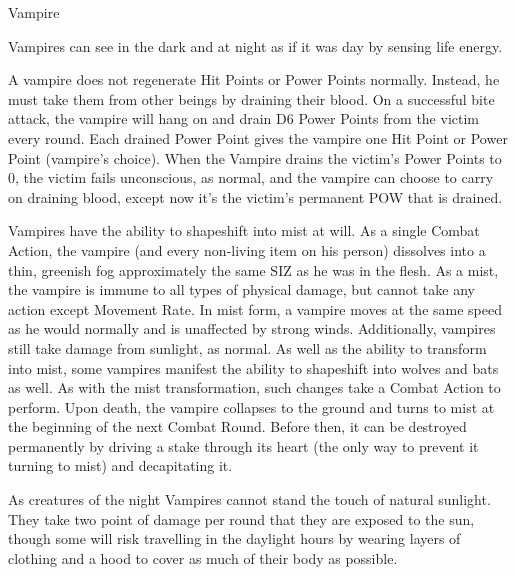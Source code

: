 \begin{monsterbox}{Vampire}
\begin{rpg-monsteraction}[Magic]
	\end{rpg-monsteraction}
	\begin{rpg-monsteraction}
		Vampires can see in the dark and at night as if it was day by sensing life energy.
	\end{rpg-monsteraction}
	\begin{rpg-monsteraction}
                A vampire does not regenerate Hit Points or Power Points normally. Instead, he must take them from other beings by draining their blood. On a successful bite attack, the vampire will hang on and drain D6 Power Points from the victim every round. Each drained Power Point gives the vampire one Hit Point or Power Point (vampire’s choice). When the Vampire drains the victim’s Power Points to 0, the victim fails unconscious, as normal, and the vampire can choose to carry on draining blood, except now it’s the victim’s permanent POW that is drained.
	\end{rpg-monsteraction}
	\begin{rpg-monsteraction}[Shapeshifting]
		Vampires have the ability to shapeshift into mist at will. As a single Combat Action, the vampire (and every non-living item on his person) dissolves into a thin, greenish fog approximately the same SIZ as he was in the flesh. As a mist, the vampire is immune to all types of physical damage, but cannot take any action except Movement Rate. In mist form, a vampire moves at the same speed as he would normally and is unaffected by strong winds. Additionally, vampires still take damage from sunlight, as normal.
		As well as the ability to transform into mist, some vampires manifest the ability to shapeshift into wolves and bats as well. As with the mist transformation, such changes take a Combat Action to perform.
		Upon death, the vampire collapses to the ground and turns to mist at the beginning of the next Combat Round. Before then, it can be destroyed permanently by driving a stake through its heart (the only way to prevent it turning to mist) and decapitating it.
	\end{rpg-monsteraction}
	\begin{rpg-monsteraction}
		As creatures of the night Vampires cannot stand the touch of natural sunlight. They take two point of damage per round that they are exposed to the sun, though some will risk travelling in the daylight hours by wearing layers of clothing and a hood to cover as much of their body as possible.
	\end{rpg-monsteraction}
	\begin{rpg-monsteraction}

\end{rpg-monsteraction}
\end{monsterbox}
